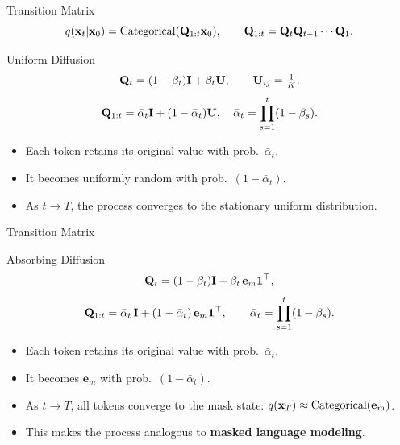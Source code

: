 \documentclass{beamer}
\renewcommand{\eqpause}{}
\begin{document}
\begin{frame}{Transition Matrix}
	\[
		q(\mathbf{x}_t|\mathbf{x}_0) = \mathrm{Categorical}(\mathbf{Q}_{1:t}\mathbf{x}_0),
		\qquad
		\mathbf{Q}_{1:t} = \mathbf{Q}_t \mathbf{Q}_{t-1} \cdots \mathbf{Q}_1.
	\]
	\eqpause
	\begin{block}{Uniform Diffusion}
		\[
			\mathbf{Q}_t = (1-\beta_t)\mathbf{I} + \beta_t \mathbf{U},
			\qquad
			\mathbf{U}_{ij} = \tfrac{1}{K}.
		\]
		\[
			\mathbf{Q}_{1:t} = \bar\alpha_t\mathbf{I} + (1 - \bar\alpha_t) \mathbf{U},
			\quad
			\bar\alpha_t = \prod_{s=1}^t (1-\beta_s).
		\]
		\eqpause
		\begin{itemize}
			\item Each token retains its original value with prob.~$\bar\alpha_t$.
			\item It becomes uniformly random with prob.~$(1 - \bar\alpha_t)$.
			\item As $t \to T$, the process converges to the stationary uniform distribution.
		\end{itemize}
	\end{block}
\end{frame}
\begin{frame}{Transition Matrix}

	\begin{block}{Absorbing Diffusion}
		\[
			\mathbf{Q}_t = (1-\beta_t)\mathbf{I} + \beta_t\, \mathbf{e}_m \mathbf{1}^\top,
		\]
		\[
			\mathbf{Q}_{1:t} = \bar\alpha_t\,\mathbf{I} + (1-\bar\alpha_t)\,\mathbf{e}_m \mathbf{1}^\top,
			\qquad
			\bar\alpha_t = \prod_{s=1}^t (1-\beta_s).
		\]
		\eqpause
		\begin{itemize}
			\item Each token retains its original value with prob.~$\bar\alpha_t$.
			\item It becomes $\mathbf{e}_m$ with prob.~$(1 - \bar\alpha_t)$.
			\item As $t \to T$, all tokens converge to the mask state: $q(\mathbf{x}_T) \approx \mathrm{Categorical}(\mathbf{e}_m)$.
			\item This makes the process analogous to \textbf{masked language modeling}.
		\end{itemize}
	\end{block}
\end{frame}
\end{document}
